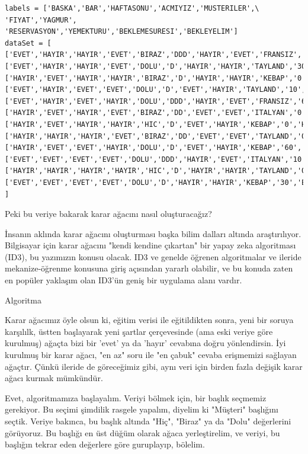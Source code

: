 \documentclass[12pt,fleqn]{article}\usepackage{../../common}
\begin{document}
\begin{verbatim}
labels = ['BASKA','BAR','HAFTASONU','ACMIYIZ','MUSTERILER',\
'FIYAT','YAGMUR', 'RESERVASYON','YEMEKTURU','BEKLEMESURESI','BEKLEYELIM']
dataSet = [
['EVET','HAYIR','HAYIR','EVET','BIRAZ','DDD','HAYIR','EVET','FRANSIZ','0','EVET'],
['EVET','HAYIR','HAYIR','EVET','DOLU','D','HAYIR','HAYIR','TAYLAND','30','HAYIR'],
['HAYIR','EVET','HAYIR','HAYIR','BIRAZ','D','HAYIR','HAYIR','KEBAP','0','EVET'],
['EVET','HAYIR','EVET','EVET','DOLU','D','EVET','HAYIR','TAYLAND','10','EVET'],
['EVET','HAYIR','EVET','HAYIR','DOLU','DDD','HAYIR','EVET','FRANSIZ','60','HAYIR'],
['HAYIR','EVET','HAYIR','EVET','BIRAZ','DD','EVET','EVET','ITALYAN','0','EVET'],
['HAYIR','EVET','HAYIR','HAYIR','HIC','D','EVET','HAYIR','KEBAP','0','HAYIR'],
['HAYIR','HAYIR','HAYIR','EVET','BIRAZ','DD','EVET','EVET','TAYLAND','0','EVET'],
['HAYIR','EVET','EVET','HAYIR','DOLU','D','EVET','HAYIR','KEBAP','60','HAYIR'],
['EVET','EVET','EVET','EVET','DOLU','DDD','HAYIR','EVET','ITALYAN','10','HAYIR'],
['HAYIR','HAYIR','HAYIR','HAYIR','HIC','D','HAYIR','HAYIR','TAYLAND','0','HAYIR'],
['EVET','EVET','EVET','EVET','DOLU','D','HAYIR','HAYIR','KEBAP','30','EVET']
]
\end{verbatim}

Peki bu veriye bakarak karar ağacını nasıl oluşturacağız?

İnsanın aklında karar ağacını oluşturması başka bilim dalları altında
araştırılıyor. Bilgisayar için karar ağacını "kendi kendine çıkartan" bir
yapay zeka algoritması (ID3), bu yazımızın konusu olacak. ID3 ve genelde
öğrenen algoritmalar ve ileride mekanize-öğrenme konusuna giriş açısından
yararlı olabilir, ve bu konuda zaten en popüler yaklaşım olan ID3'ün geniş
bir uygulama alanı vardır.

Algoritma

Karar ağacımız öyle olsun ki, eğitim verisi ile eğitildikten sonra, yeni
bir soruya karşılılk, üstten başlayarak yeni şartlar çerçevesinde (ama eski
veriye göre kurulmuş) ağaçta bizi bir 'evet' ya da 'hayır' cevabına doğru
yönlendirsin. İyi kurulmuş bir karar ağacı, "en az" soru ile "en çabuk"
cevaba erişmemizi sağlayan ağaçtır. Çünkü ileride de göreceğimiz gibi, aynı
veri için birden fazla değişik karar ağacı kurmak mümkündür.

Evet, algoritmamıza başlayalım. Veriyi bölmek için, bir başlık seçmemiz
gerekiyor. Bu seçimi şimdilik rasgele yapalım, diyelim ki "Müşteri"
başlığını seçtik. Veriye bakınca, bu başlık altında "Hiç", "Biraz" ya da
"Dolu" değerlerini görüyoruz. Bu başlığı en üst düğüm olarak ağaca
yerleştirelim, ve veriyi, bu başlığın tekrar eden değerlere göre
guruplayıp, bölelim.
\end{document}
